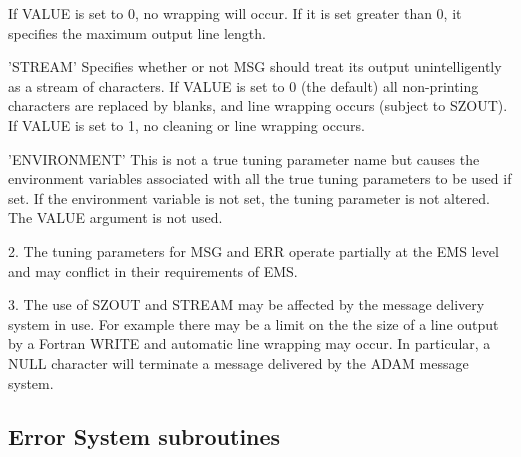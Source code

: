 \documentclass[twoside,11pt]{article}
\newcommand{\xlabel}[1]{}
\renewcommand{\_}{\texttt{\symbol{95}}}
\newcommand{\sstitem}{\item}
\newcommand{\sstitem}{\item}
\begin{document}
\begin {small}
{{{{         If VALUE is set to 0, no wrapping will occur. If it is set greater
         than 0, it specifies the maximum output line length.
      }        
      \sstitem{'STREAM' Specifies whether or not MSG should treat its output 
         unintelligently as a stream of characters.
         If VALUE is set to 0 (the default) all non-printing characters are
         replaced by blanks, and line wrapping occurs (subject to SZOUT). 
         If VALUE is set to 1, no cleaning or line wrapping occurs.
      }   
      \sstitem{'ENVIRONMENT' This is not a true tuning parameter name but causes
         the environment variables associated with all the true tuning 
         parameters to be used if set. If the environment variable is 
         not set, the tuning parameter is not altered. The VALUE argument
         is not used.
      }
      }          

      2. The tuning parameters for MSG and ERR operate partially at the EMS
         level and may conflict in their requirements of EMS.

      3. The use of SZOUT and STREAM may be affected by the message delivery
        system in use. For example there may be a limit on the the size of a
        line output by a Fortran WRITE and automatic line wrapping may occur.
        In particular, a NULL character will terminate a message delivered by
        the ADAM message system.
   }
}
\end {small}

\newpage
\subsection{\xlabel{error_system_subroutines}Error System subroutines}
\end{document}

